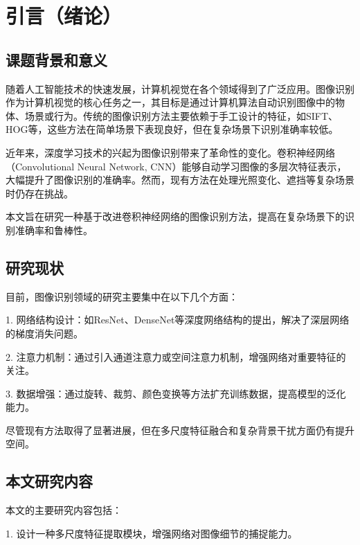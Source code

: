 \documentclass[a4paper,12pt]{article}
\begin{document}
\newpage
{}

\clearpage
\section{引言（绪论）}

\subsection{课题背景和意义}

随着人工智能技术的快速发展，计算机视觉在各个领域得到了广泛应用。图像识别作为计算机视觉的核心任务之一，其目标是通过计算机算法自动识别图像中的物体、场景或行为。传统的图像识别方法主要依赖于手工设计的特征，如SIFT、HOG等，这些方法在简单场景下表现良好，但在复杂场景下识别准确率较低\cite{ref1}。

近年来，深度学习技术的兴起为图像识别带来了革命性的变化。卷积神经网络（Convolutional Neural Network, CNN）能够自动学习图像的多层次特征表示，大幅提升了图像识别的准确率。然而，现有方法在处理光照变化、遮挡等复杂场景时仍存在挑战\cite{ref2}。

本文旨在研究一种基于改进卷积神经网络的图像识别方法，提高在复杂场景下的识别准确率和鲁棒性。

\subsection{研究现状}

目前，图像识别领域的研究主要集中在以下几个方面：

1. 网络结构设计：如ResNet\cite{ref3}、DenseNet等深度网络结构的提出，解决了深层网络的梯度消失问题。

2. 注意力机制：通过引入通道注意力或空间注意力机制，增强网络对重要特征的关注\cite{ref4}。

3. 数据增强：通过旋转、裁剪、颜色变换等方法扩充训练数据，提高模型的泛化能力。

尽管现有方法取得了显著进展，但在多尺度特征融合和复杂背景干扰方面仍有提升空间。

\subsection{本文研究内容}

本文的主要研究内容包括：

1. 设计一种多尺度特征提取模块，增强网络对图像细节的捕捉能力。
\end{document}
